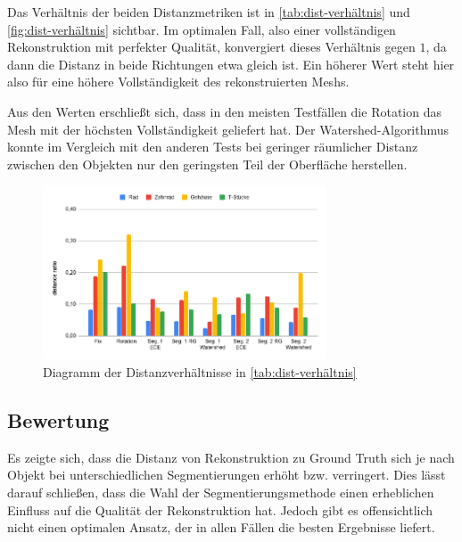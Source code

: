 Das Verhältnis der beiden Distanzmetriken ist in \autoref{tab:dist-verhältnis} und \autoref{fig:dist-verhältnis} sichtbar.
Im optimalen Fall, also einer vollständigen Rekonstruktion mit perfekter Qualität, konvergiert dieses Verhältnis gegen $1$, da dann die Distanz in beide Richtungen etwa gleich ist.
Ein höherer Wert steht hier also für eine höhere Vollständigkeit des rekonstruierten Meshs.

Aus den Werten erschließt sich, dass in den meisten Testfällen die Rotation das Mesh mit der höchsten Vollständigkeit geliefert hat.
Der Watershed-Algorithmus konnte im Vergleich mit den anderen Tests bei geringer räumlicher Distanz zwischen den Objekten nur den geringsten Teil der Oberfläche herstellen.

\begin{figure}[H]
    \centering
    \includegraphics[width=0.75\textwidth]{images/segmentation/ratio.png}
    \caption{Diagramm der Distanzverhältnisse in \autoref{tab:dist-verhältnis}}
    \label{fig:dist-verhältnis}
\end{figure}


\subsection{Bewertung}
\label{subsec:auswertung-daten-bewertung}

Es zeigte sich, dass die Distanz von Rekonstruktion zu Ground Truth sich je nach Objekt bei unterschiedlichen Segmentierungen erhöht bzw. verringert.
Dies lässt darauf schließen, dass die Wahl der Segmentierungsmethode einen erheblichen Einfluss auf die Qualität der Rekonstruktion hat.
Jedoch gibt es offensichtlich nicht einen optimalen Ansatz, der in allen Fällen die besten Ergebnisse liefert.

